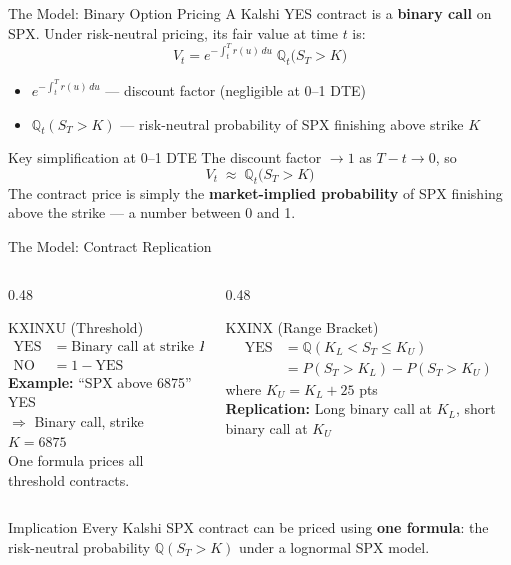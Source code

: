 \documentclass[aspectratio=169]{beamer}
\begin{document}
\begin{frame}{The Model: Binary Option Pricing}
  A Kalshi YES contract is a \textbf{binary call} on SPX\@. Under risk-neutral pricing,
  its fair value at time $t$ is:
  \[
    V_t = e^{-\int_t^T r(u)\,du}\;\mathbb{Q}_t\!\bigl(S_T > K\bigr)
  \]
  \begin{itemize}
    \item $e^{-\int_t^T r(u)\,du}$ --- discount factor (negligible at 0--1 DTE)
    \item $\mathbb{Q}_t(S_T > K)$ --- risk-neutral probability of SPX finishing above strike $K$
  \end{itemize}
  \begin{alertblock}{Key simplification at 0--1 DTE}
    The discount factor $\to 1$ as $T - t \to 0$, so
    \[
      V_t \;\approx\; \mathbb{Q}_t\!\bigl(S_T > K\bigr)
    \]
    The contract price is simply the \textbf{market-implied probability} of SPX
    finishing above the strike --- a number between 0 and 1.
  \end{alertblock}
\end{frame}

\begin{frame}{The Model: Contract Replication}
  \begin{columns}[T,onlytextwidth]
    \begin{column}{0.48\textwidth}
      \begin{block}{KXINXU (Threshold)}
        \begin{align*}
          \text{YES} &= \text{Binary call at strike } K \\
          \text{NO}  &= 1 - \text{YES}
        \end{align*}
        \textbf{Example:} ``SPX above 6875'' YES\\
        $\Rightarrow$ Binary call, strike $K = 6875$\\[6pt]
        One formula prices all threshold contracts.
      \end{block}
    \end{column}
    \begin{column}{0.48\textwidth}
      \begin{block}{KXINX (Range Bracket)}
        \begin{align*}
          \text{YES} &= \mathbb{Q}(K_L < S_T \leq K_U) \\
                     &= P(S_T{>}K_L) - P(S_T{>}K_U)
        \end{align*}
        where $K_U = K_L + 25$ pts\\[4pt]
        \textbf{Replication:} Long binary call at $K_L$, short binary call at $K_U$
      \end{block}
    \end{column}
  \end{columns}
  \vspace{0.5em}
  \begin{block}{Implication}
    Every Kalshi SPX contract can be priced using \textbf{one formula}:
    the risk-neutral probability $\mathbb{Q}(S_T > K)$ under a lognormal SPX model.
  \end{block}
\end{frame}
\end{document}
